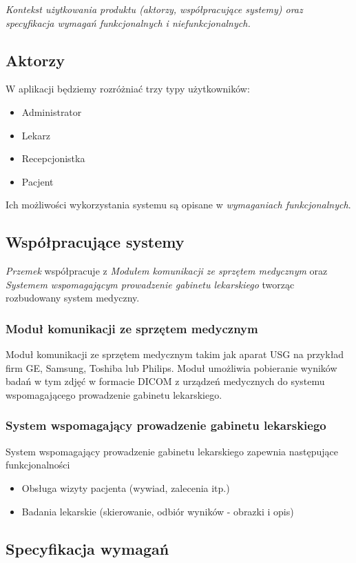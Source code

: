 \documentclass[polish,12pt]{aghthesis}
\begin{document}
\emph{Kontekst użytkowania produktu (aktorzy, współpracujące systemy)
  oraz specyfikacja wymagań funkcjonalnych i niefunkcjonalnych.}
  
\subsection{Aktorzy}
W aplikacji będziemy rozróżniać trzy typy użytkowników:
\begin{itemize}
    \item Administrator
    \item Lekarz
    \item Recepcjonistka
    \item Pacjent
\end{itemize}
Ich możliwości wykorzystania systemu są opisane w \emph{wymaganiach funkcjonalnych}. 

\subsection{Współpracujące systemy}
\emph{Przemek} współpracuje z \emph{Modułem komunikacji ze sprzętem medycznym} oraz \emph{Systemem wspomagającym prowadzenie gabinetu lekarskiego} tworząc rozbudowany system medyczny.

\subsubsection{Moduł komunikacji ze sprzętem medycznym}
Moduł komunikacji ze sprzętem medycznym takim jak aparat USG na przykład firm GE, Samsung, Toshiba lub Philips. Moduł umożliwia pobieranie wyników badań w tym zdjęć w formacie DICOM z urządzeń medycznych do systemu wspomagającego prowadzenie gabinetu lekarskiego.
\subsubsection{System wspomagający prowadzenie gabinetu lekarskiego}
System wspomagający prowadzenie gabinetu lekarskiego zapewnia następujące funkcjonalności
\begin{itemize}
  \item Obsługa wizyty pacjenta (wywiad, zalecenia itp.)
  \item Badania lekarskie (skierowanie, odbiór wyników - obrazki i opis)
\end{itemize}

\subsection{Specyfikacja wymagań}
\end{document}
